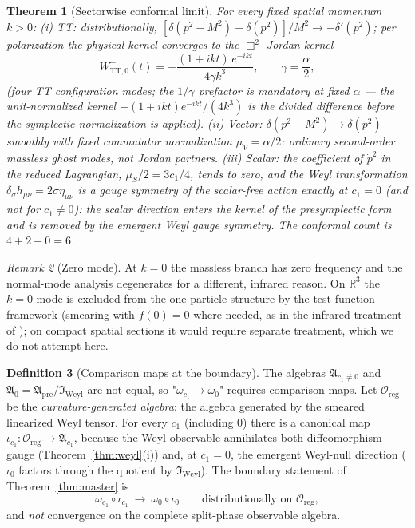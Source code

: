 \documentclass[11pt]{article}
\newtheorem{theorem}{Theorem}[section]
\theoremstyle{definition}
\newtheorem{definition}[theorem]{Definition}
\theoremstyle{remark}
\newtheorem{remark}[theorem]{Remark}
\newcommand{\R}{\mathbb{R}}
\begin{document}
\begin{theorem}[Sectorwise conformal limit]\label{thm:conformal}
For every fixed spatial momentum $k>0$:
(i) TT: distributionally,
$[\delta(p^2-M^2)-\delta(p^2)]/M^2\to-\delta'(p^2)$; per polarization the
physical kernel converges to the $\Box^2$ Jordan kernel
\begin{equation}
W^+_{\mathrm{TT},0}(t)=-\frac{(1+ikt)\,e^{-ikt}}{4\gamma k^3},
\qquad \gamma=\frac{\alpha}{2},
\end{equation}
(four TT configuration modes; the $1/\gamma$ prefactor is mandatory at
fixed $\alpha$ --- the unit-normalized kernel $-(1+ikt)e^{-ikt}/(4k^3)$
is the divided difference before the symplectic normalization is
applied).
(ii) Vector: $\delta(p^2-M^2)\to\delta(p^2)$ smoothly with \emph{fixed}
commutator normalization $\mu_V=\alpha/2$: ordinary second-order massless
ghost modes, not Jordan partners.
(iii) Scalar: the coefficient of $\dot p^2$ in the reduced Lagrangian,
$\mu_S/2=3c_1/4$, tends to zero, and the Weyl transformation
$\delta_\sigma h_{\mu\nu}=2\sigma\eta_{\mu\nu}$ is a gauge symmetry of
the scalar-free action exactly at $c_1=0$ (and not for $c_1\neq0$): the
scalar direction enters the kernel of the presymplectic form and is
removed by the emergent Weyl gauge symmetry.
The conformal count is $4+2+0=6$.
\end{theorem}

\begin{remark}[Zero mode]
At $k=0$ the massless branch has zero frequency and the normal-mode
analysis degenerates for a different, infrared reason.  On $\R^3$ the
$k=0$ mode is excluded from the one-particle structure by the
test-function framework (smearing with $\tilde f(0)=0$ where needed, as
in the infrared treatment of \cite{companion3}); on compact spatial
sections it would require separate treatment, which we do not attempt
here.
\end{remark}

\begin{definition}[Comparison maps at the boundary]\label{def:compmaps}
The algebras $\mathfrak A_{c_1\neq0}$ and $\mathfrak A_0
=\mathfrak A_{\mathrm{pre}}/\mathfrak I_{\mathrm{Weyl}}$ are not equal,
so "$\omega_{c_1}\to\omega_0$" requires comparison maps.  Let
$\mathcal O_{\mathrm{reg}}$ be the \emph{curvature-generated algebra}:
the algebra generated by the smeared linearized Weyl tensor.  For every
$c_1$ (including $0$) there is a canonical map
$\iota_{c_1}:\mathcal O_{\mathrm{reg}}\to\mathfrak A_{c_1}$, because the
Weyl observable annihilates both diffeomorphism gauge
(Theorem~\ref{thm:weyl}(i)) and, at $c_1=0$, the emergent Weyl-null
direction ($\iota_0$ factors through the quotient by
$\mathfrak I_{\mathrm{Weyl}}$).  The boundary statement of
Theorem~\ref{thm:master} is
\begin{equation}\label{eq:convergence}
\omega_{c_1}\circ\iota_{c_1}\ \longrightarrow\ \omega_0\circ\iota_0
\qquad\text{distributionally on }\mathcal O_{\mathrm{reg}},
\end{equation}
and \emph{not} convergence on the complete split-phase observable
algebra.
\end{definition}
\end{document}

